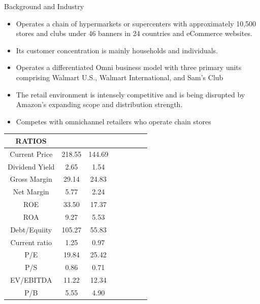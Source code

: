 \documentclass[pdf]{beamer}
\theoremstyle{remark}
\theoremstyle{definition}
\begin{document}
\begin{frame}[allowframebreaks]{Background and Industry}
    \begin{itemize}
    	\item Operates a chain of hypermarkets or supercenters with approximately 10,500 stores and clubs under 46 banners in 24 countries and eCommerce websites.
    	\item Its customer concentration is mainly households and individuals. 
    	\item Operates a differentiated Omni business model with three primary units comprising Walmart U.S., Walmart International, and Sam's Club
    	\item The retail environment is intensely competitive and is being disrupted by Amazon’s expanding scope and distribution strength.
    	\item Competes with omnichannel retailers who operate chain stores
    \end{itemize}

\begin{table}[ht]
	\centering\captionsetup{justification = centering}
	\label{1}
	\begin{tabular}{|Sc|Sc|Sc|Sc}
		\hline
		RATIOS &  & \\
		\hline
		Current Price & 218.55 & 144.69 \\
		Dividend Yield& 2.65 &1.54\\
		Gross Margin & 29.14 &24.83 \\
		Net Margin & 5.77& 2.24\\
		ROE & 33.50&17.37\\
		ROA & 9.27 &5.53&\\
	    Debt/Equiity & 105.27& 55.83\\
		Current ratio & 1.25 & 0.97\\
		P/E  & 19.84& 25.42\\
		P/S & 0.86 & 0.71\\
		EV/EBITDA & 11.22 & 12.34\\
		P/B & 5.55 & 4.90\\
			\hline
	\end{tabular}
\end{table}


\end{frame}
\end{document}
